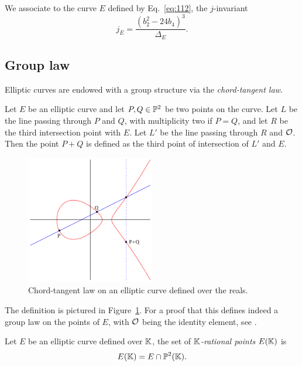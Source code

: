 \begin{definition}[$j$-invariant]
  We associate to the curve $E$ defined by Eq.~\eqref{eq:112}, the
  $j$-invariant
 \[j_E = \frac{(b_2^2-24b_4)^3}{\Delta_E}\text{.}\]
\end{definition}


\subsection{Group law}
\label{sec:group-law}
Elliptic curves are endowed with a group structure via the
\emph{chord-tangent law}.

\begin{definition}
  Let $E$ be an elliptic curve and let $P,Q\in\mathbb{P}^2$ be two points
  on the curve. Let $L$ be the line passing through $P$ and $Q$, with
  multiplicity two if $P=Q$, and let $R$ be the third intersection
  point with $E$.  Let $L'$ be the line passing through $R$ and
  $\mathcal{O}$. Then the point $P+Q$ is defined as the third point of
  intersection of $L'$ and $E$.
\end{definition}

\begin{figure}[ht]
  \centering
  \includegraphics[width=0.5\textwidth]{isogeny/ec-add}
  \caption{Chord-tangent law on an elliptic curve defined over the reals.}
  \label{fig:chord-tangent}
\end{figure}

The definition is pictured in Figure~\ref{fig:chord-tangent}. For a
proof that this defines indeed a group law on the points of $E$, with
$\mathcal{O}$ being the identity element, see \cite[II, $\S2$]{silverman:elliptic}.

\begin{definition}%
  Let $E$ be an elliptic curve defined over $\mathbb{K}$, the set of
  \emph{$\mathbb{K}$-rational points} $E(\mathbb{K})$ is 
  \begin{equation}
    \label{eq:119}
    E(\mathbb{K}) = E \cap \mathbb{P}^2(\mathbb{K})
    \text{.}
  \end{equation}
\end{definition}

